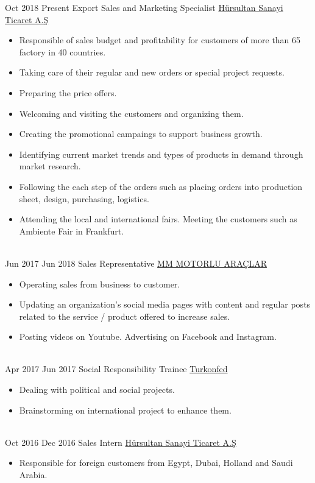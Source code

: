 \documentclass[letterpaper]{ragip_class} %
\begin{document}
\begin{twenty}
	\twentyitem
		{Oct 2018}
		{Present}
		{\hspace{0.3cm}Export Sales and Marketing Specialist}
		{\href{http://www.hursultan.com.tr/}{Hürsultan Sanayi Ticaret A.Ş}}
		{}
		{\begin{itemize}
			\item Responsible of sales budget and profitability for customers of more than 65 factory in 40 countries.
			\item Taking care of their regular and new orders or special project requests.
			\item Preparing the price offers.
			\item Welcoming and visiting the customers and organizing them.
			\item Creating the promotional campaings to support business growth.
			\item Identifying current market trends and types of products in demand through market research.
			\item Following the each step of the orders such as placing orders into production sheet, design, purchasing, logistics.
			\item Attending the local and international fairs. Meeting the customers such as Ambiente Fair in Frankfurt.
		\end{itemize}}
		\\
	\twentyitem
		{Jun 2017}
		{Jun 2018}
		{\hspace{0.3cm}Sales Representative}
		{\href{https://mmmotorluaraclar.sahibinden.com/}{MM MOTORLU ARAÇLAR}}
		{}
		{\begin{itemize}
			\item Operating sales from business to customer.
			\item Updating an organization's social media pages with content and regular posts related to the service / product offered to increase sales.
			\item Posting videos on Youtube. Advertising on Facebook and Instagram.
		\end{itemize}}
		\\
	\twentyitem
    	{Apr 2017}
		{Jun 2017}
        {\hspace{0.3cm}Social Responsibility Trainee}
        {\href{http://www.turkonfed.org/tr/}{Turkonfed}}
        {}
        {\begin{itemize}
        \item Dealing with political and social projects.
        \item Brainstorming on international project to enhance them. 
        \end{itemize}}
        \\
	\twentyitem
    	{Oct 2016}
		{Dec 2016}
        {\hspace{0.3cm}Sales Intern}
        {\href{http://www.hursultan.com.tr/}{Hürsultan Sanayi Ticaret A.Ş}}
        {}
        {
        {\begin{itemize}
        \item Responsible for foreign customers from Egypt, Dubai, Holland and Saudi Arabia. 
    \end{itemize}}
        }
\end{twenty}
\end{document}
